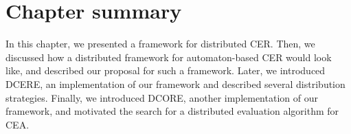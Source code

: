 \section{Chapter summary}

In this chapter, we presented a framework for distributed CER. Then, we discussed how a distributed framework for automaton-based CER would look like, and described our proposal for such a framework. Later, we introduced DCERE, an implementation of our framework and described several distribution strategies. Finally, we introduced DCORE, another implementation of our framework, and motivated the search for a distributed evaluation algorithm for CEA.
